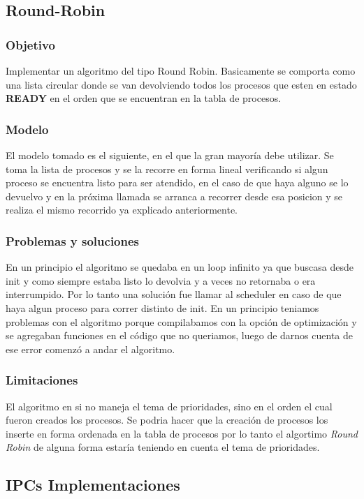 \documentclass[10pt,a4paper]{article}
\begin{document}
\subsection{Round-Robin}
	\subsubsection{Objetivo}
		Implementar un algoritmo del tipo Round Robin. Basicamente se comporta como una lista circular donde se van devolviendo todos los procesos que esten en estado \textbf{READY} en el orden que se encuentran en la tabla de procesos.
	\subsubsection{Modelo}
		El modelo tomado es el siguiente, en el que la gran mayor\'ia debe utilizar. Se toma la lista de procesos y se la recorre en forma lineal verificando si algun proceso se encuentra listo para ser atendido, en el caso de que haya alguno se lo devuelvo y en la pr\'oxima llamada se arranca a recorrer desde esa posicion y se realiza el mismo recorrido ya explicado anteriormente.
	\subsubsection{Problemas y soluciones}
		En un principio el algoritmo se quedaba en un loop infinito ya que buscasa desde init y como siempre estaba listo lo devolvia y a veces no retornaba o era interrumpido. Por lo tanto una soluci\'on fue llamar al scheduler en caso de que haya algun proceso para correr distinto de init. En un principio teniamos problemas con el algoritmo porque compilabamos con la opci\'on de optimizaci\'on y se agregaban funciones en el c\'odigo que no queriamos, luego de darnos cuenta de ese error comenz\'o a andar el algoritmo.
	\subsubsection{Limitaciones}
		El algoritmo en si no maneja el tema de prioridades, sino en el orden el cual fueron creados los procesos. Se podria hacer que la creaci\'on de procesos los inserte en forma ordenada en la tabla de procesos por lo tanto el algortimo \textit{Round Robin} de alguna forma estar\'ia teniendo en cuenta el tema de prioridades.

\subsection{IPCs Implementaciones}
\end{document}
